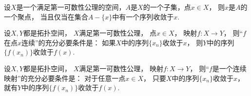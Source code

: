 \begin{theorem}
设\(X\)是一个满足第一可数性公理的空间，\(A\)是\(X\)的一个子集，点\(x \in X\)，
则\(x\)是\(A\)的一个聚点，
当且仅当在集合\(A-\{x\}\)中有一个序列收敛于\(x\).
\end{theorem}

\begin{theorem}
设\(X,Y\)都是拓扑空间，
\(X\)满足第一可数性公理，
点\(x \in X\)，
映射\(f\colon X \to Y\)，
则“\(f\)在点\(x\)连续”的充分必要条件是：
如果\(X\)中的序列\(\{x_n\}\)收敛于\(x\)，
则\(Y\)中的序列\(\{f(x_n)\}\)收敛于\(f(x)\).
\end{theorem}

\begin{theorem}
设\(X,Y\)都是拓扑空间，
\(X\)满足第一可数性公理，
映射\(f\colon X \to Y\)，
则“\(f\)是一个连续映射”的充分必要条件是：
对于任意一点\(x \in X\)，
只要\(X\)中的序列\(\{x_n\}\)收敛于\(x\)，
就有\(Y\)中的序列\(\{f(x_n)\}\)收敛于\(f(x)\).
\end{theorem}

